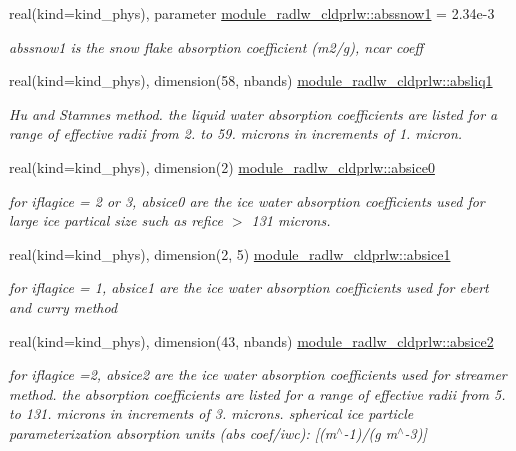 \begin{DoxyCompactItemize}
real(kind=kind\+\_\+phys), parameter \hyperlink{namespacemodule__radlw__cldprlw_a7d12b328d9dec0c525a4b0824ae7ab44}{module\+\_\+radlw\+\_\+cldprlw\+::abssnow1} = 2.\+34e-\/3
\begin{DoxyCompactList}\small\item\em abssnow1 is the snow flake absorption coefficient (m2/g), ncar coeff \end{DoxyCompactList}\item 
real(kind=kind\+\_\+phys), dimension(58, nbands) \hyperlink{namespacemodule__radlw__cldprlw_a57896538226e9184c3750440d9f62166}{module\+\_\+radlw\+\_\+cldprlw\+::absliq1}
\begin{DoxyCompactList}\small\item\em Hu and Stamnes method. the liquid water absorption coefficients are listed for a range of effective radii from 2. to 59. microns in increments of 1. micron. \end{DoxyCompactList}\item 
real(kind=kind\+\_\+phys), dimension(2) \hyperlink{namespacemodule__radlw__cldprlw_a6610d37cab9ccd4de89237c5de536cfb}{module\+\_\+radlw\+\_\+cldprlw\+::absice0}
\begin{DoxyCompactList}\small\item\em for iflagice = 2 or 3, absice0 are the ice water absorption coefficients used for large ice partical size such as refice $>$ 131 microns. \end{DoxyCompactList}\item 
real(kind=kind\+\_\+phys), dimension(2, 5) \hyperlink{namespacemodule__radlw__cldprlw_a3b86ff9d6791d95170d3b3ab61cd8291}{module\+\_\+radlw\+\_\+cldprlw\+::absice1}
\begin{DoxyCompactList}\small\item\em for iflagice = 1, absice1 are the ice water absorption coefficients used for ebert and curry method \end{DoxyCompactList}\item 
real(kind=kind\+\_\+phys), dimension(43, nbands) \hyperlink{namespacemodule__radlw__cldprlw_ad2238686c0e6d1c5d74bcfdde1542e1d}{module\+\_\+radlw\+\_\+cldprlw\+::absice2}
\begin{DoxyCompactList}\small\item\em for iflagice =2, absice2 are the ice water absorption coefficients used for streamer method. the absorption coefficients are listed for a range of effective radii from 5. to 131. microns in increments of 3. microns. spherical ice particle parameterization absorption units (abs coef/iwc)\+: \mbox{[}(m$^\wedge$-\/1)/(g m$^\wedge$-\/3)\mbox{]} \end{DoxyCompactList}\item 

\end{DoxyCompactItemize}
